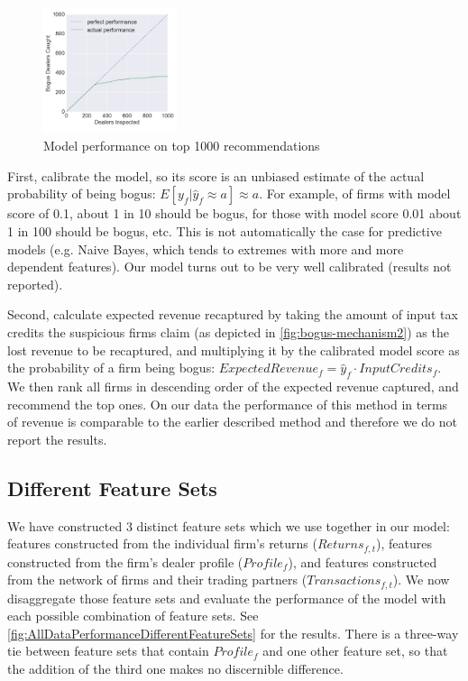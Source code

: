 \begin{figure}
  \includegraphics[width=0.35\textwidth]{graphs/PerformanceAllData_v2.png}
  \caption{Model performance on top 1000 recommendations}
  \label{fig:AllDataPerformanceTop1000}
\end{figure}
First, calibrate the model, so its score is an unbiased estimate of the actual probability of being bogus: $E[y_f|\hat{y}_f\approx a]\approx a$. For example, of firms with model score of 0.1, about 1 in 10 should be bogus, for those with model score  0.01 about 1 in 100 should be bogus, etc. This is not automatically the case for predictive models (e.g. Naive Bayes, which tends to extremes with more and more dependent features). Our model turns out to be very well calibrated (results not reported).

Second, calculate expected revenue recaptured by taking the amount of input tax credits the suspicious firms claim (as depicted in \cref{fig:bogus-mechanism2}) as the lost revenue to be recaptured, and multiplying it by the calibrated model score as the probability of a firm being bogus: $ExpectedRevenue_f=\hat{y}_f\cdot InputCredits_f$. We then rank all firms in descending order of the expected revenue captured, and recommend the top ones. On our data the performance of this method in terms of revenue is comparable to the earlier described method and therefore we do not report the results.

\subsection{Different Feature Sets}
\label{subsec:feature-sets}
We have constructed 3 distinct feature sets which we use together in our model: features constructed from the individual firm's returns ($Returns_{f,t}$), features constructed from the firm's dealer profile ($Profile_f$), and features constructed from the network of firms and their trading partners ($Transactions_{f,t}$). We now disaggregate those feature sets and evaluate the performance of the model with each possible combination of feature sets. See \cref{fig:AllDataPerformanceDifferentFeatureSets} for the results. There is a three-way tie between feature sets that contain $Profile_f$ and one other feature set, so that the addition of the third one makes no discernible difference.

